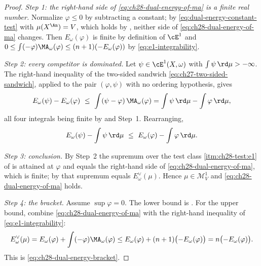 \begin{proof}
\emph{Step 1: the right-hand side of \eqref{eq:ch28-dual-energy-of-ma} is a
finite real number.}  Normalize \(\varphi\leq0\) by subtracting a constant;
by \eqref{eq:dual-energy-constant-test} with \(\mu(X^{\An})=V\), which holds
by , neither side of
\eqref{eq:ch28-dual-energy-of-ma} changes.  Then \(E_\omega(\varphi)\) is
finite by definition of \(\cE^1\) and
\(0\leq\int(-\varphi)\MA_\omega(\varphi)\leq(n+1)(-E_\omega(\varphi))\) by
\eqref{eq:e1-integrability}.

\emph{Step 2: every competitor is dominated.}  Let
\(\psi\in\cE^1(X,\omega)\) with \(\int\psi\,\rd\mu>-\infty\).  The
right-hand inequality of the two-sided sandwich
\eqref{eq:ch27-two-sided-sandwich}, applied to the pair
\((\varphi,\psi)\) with no ordering hypothesis, gives
\[
 E_\omega(\psi)-E_\omega(\varphi)
 \ \leq\ \int(\psi-\varphi)\,\MA_\omega(\varphi)
 =\int\psi\,\rd\mu-\int\varphi\,\rd\mu ,
\]
all four integrals being finite by
 and Step~1.  Rearranging,
\[
 E_\omega(\psi)-\int\psi\,\rd\mu
 \ \leq\ E_\omega(\varphi)-\int\varphi\,\rd\mu .
\]

\emph{Step 3: conclusion.}  By Step~2 the supremum over the test class
\cref{itm:ch28-test:e1} of  is attained at
\(\varphi\) and equals the right-hand side of
\eqref{eq:ch28-dual-energy-of-ma}, which is finite; by
 that supremum equals \(E^\vee_\omega(\mu)\).
Hence \(\mu\in\mathcal M^1_V\) and \eqref{eq:ch28-dual-energy-of-ma} holds.

\emph{Step 4: the bracket.}  Assume \(\sup\varphi=0\).  The lower bound is
.  For the upper bound, combine
\eqref{eq:ch28-dual-energy-of-ma} with the right-hand inequality of
\eqref{eq:e1-integrability}:
\[
 E^\vee_\omega(\mu)
 =E_\omega(\varphi)+\int(-\varphi)\MA_\omega(\varphi)
 \leq E_\omega(\varphi)+(n+1)\bigl(-E_\omega(\varphi)\bigr)
 =n\bigl(-E_\omega(\varphi)\bigr).
\]
This is \eqref{eq:ch28-dual-energy-bracket}.
\end{proof}

